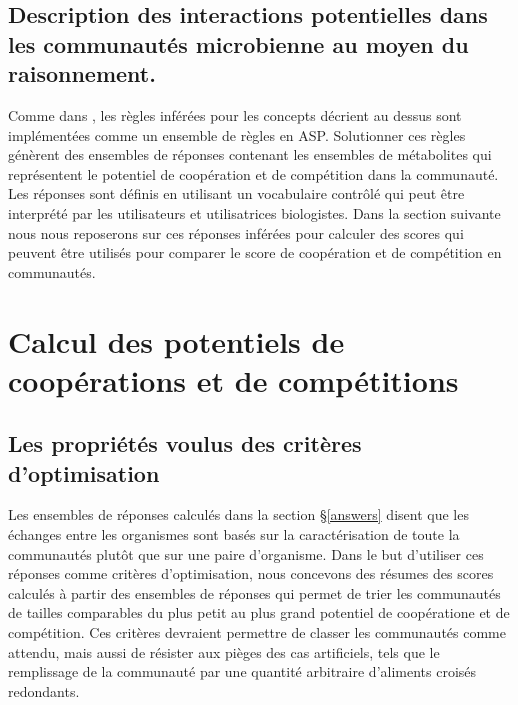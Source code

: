 \subsection{Description des interactions potentielles dans les communautés microbienne au moyen du raisonnement.} Comme dans \citep{Frioux2018}, les règles inférées pour les concepts décrient au dessus sont implémentées comme un ensemble de règles en ASP. Solutionner ces règles génèrent des ensembles de réponses contenant les ensembles de métabolites qui représentent le potentiel de coopération et de compétition dans la communauté. Les réponses sont définis en utilisant un vocabulaire contrôlé qui peut être interprété par les utilisateurs et utilisatrices biologistes. Dans la section suivante nous nous reposerons sur ces réponses inférées pour calculer des scores qui peuvent être utilisés pour comparer le score de coopération et de compétition en communautés.

\section{Calcul des potentiels de coopérations et de compétitions}\label{score}

\subsection{Les propriétés voulus des critères d'optimisation} Les ensembles de réponses calculés dans la section \S\ref{answers} disent que les échanges entre les organismes sont basés sur la caractérisation de toute la communautés plutôt que sur une paire d'organisme. Dans le but d'utiliser ces réponses comme critères d'optimisation, nous concevons des résumes des scores calculés à partir des ensembles de réponses qui permet de trier les communautés de tailles comparables du plus petit au plus grand potentiel de coopératione et de compétition. Ces critères devraient permettre de classer les communautés comme attendu, mais aussi de résister aux pièges des cas artificiels, tels que le remplissage de la communauté par une quantité arbitraire d'aliments croisés redondants. 

